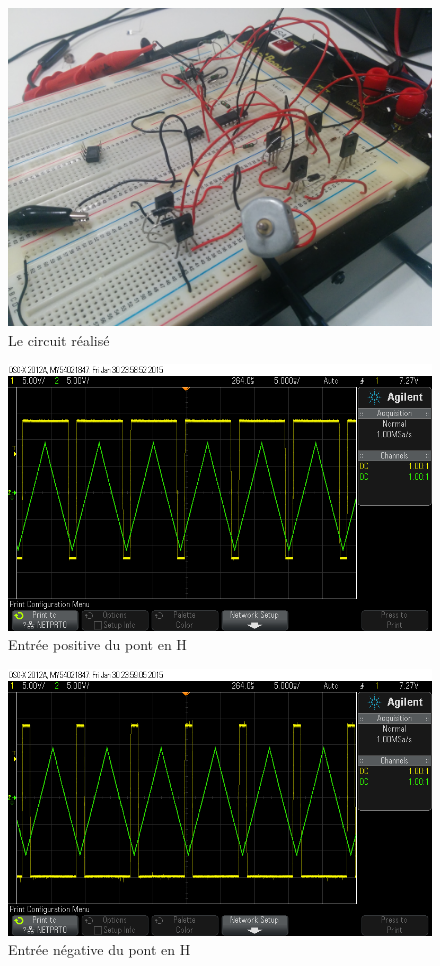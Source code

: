 \documentclass[a4paper]{article}
\begin{document}
\begin{figure}[h!]
  \centering
    \includegraphics[width=1\textwidth]{circuit}
  \caption{Le circuit réalisé}
\end{figure}

\begin{figure}[h!]
  \centering
    \includegraphics[width=1\textwidth]{scope_1}
  \caption{Entrée positive du pont en H}
\end{figure}

\begin{figure}[h!]
  \centering
    \includegraphics[width=1\textwidth]{scope_2}
  \caption{Entrée négative du pont en H}
\end{figure}
\end{document}
